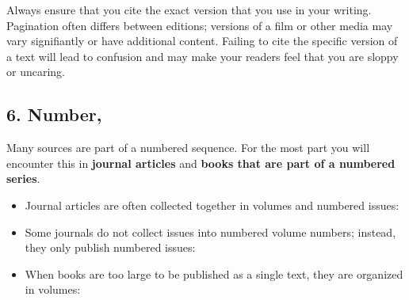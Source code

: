  \bigskip

 \bigskip

\bigskip

\noindent Always ensure that you cite the exact version that you use in your writing. Pagination often differs between editions; versions of a film or other media may vary signifiantly or have additional content. Failing to cite the specific version of a text will lead to confusion and may make your readers feel that you are sloppy or uncaring. 

\subsection{6. Number,}

Many sources are part of a numbered sequence. For the most part you will encounter this in \textbf{journal articles} and \textbf{books that are part of a numbered series}.
 
\bigskip

\begin{itemize}
\item Journal articles are often collected together in volumes and numbered issues: 
\end{itemize}

\medskip

\begin{itemize}
\item Some journals do not collect issues into numbered volume numbers; instead, they only publish numbered issues:\end{itemize}

\medskip

\begin{itemize}
\item When books are too large to be published as a single text, they are organized in volumes: 
\end{itemize}


